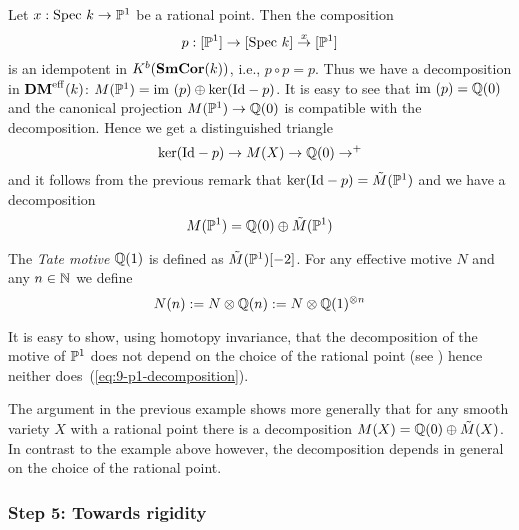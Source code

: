 \begin{exam}
  Let $x: \mathrm{Spec}~ k \to \mathbb{P}^1$ be a rational point. Then the
  composition
\begin{equation*}
  p: [\mathbb{P}^1] \to [\mathrm{Spec}~ k] \stackrel{x}{\to} [\mathbb{P}^1]
\end{equation*}
is an idempotent in $K^b(\mathbf{SmCor}(k))$, i.e., $p \circ p = p$. Thus we
have a decomposition in $\mathbf{DM}^{\mathrm{eff}}(k)$:
$M(\mathbb{P}^1)=\mathrm{im}~(p)\oplus\ker(\mathrm{Id}-p)$. It is easy to see
that $\mathrm{im}~(p)=\mathbb{Q}(0)$ and the canonical projection
$M(\mathbb{P}^1)\to\mathbb{Q}(0)$ is compatible with the decomposition. Hence we
get a distinguished triangle
\begin{equation*}
  \ker(\mathrm{Id}-p)\to M(X)\to\mathbb{Q}(0)\to^{+}
\end{equation*}
and it follows from the previous remark that
$\ker(\mathrm{Id}-p)=\tilde{M}(\mathbb{P}^{1})$ and we have a decomposition
\begin{equation*}
  M(\mathbb{P}^{1})=\mathbb{Q}(0)\oplus\tilde{M}(\mathbb{P}^{1})
\end{equation*}  
\end{exam}
\begin{defn}
  The \emph{Tate motive} $\mathbb{Q}(1)$ is defined as
  $\tilde{M}(\mathbb{P}^{1})[-2]$. For any effective motive $N$ and any
  $n\in\mathbb{N}$ we define
  \begin{equation*}
    N(n):=N\otimes\mathbb{Q}(n):=N\otimes\mathbb{Q}(1)^{\otimes n}
  \end{equation*}
\end{defn}
It is easy to show, using homotopy invariance, that the decomposition
of the motive of $\mathbb{P}^{1}$ does not depend on the choice of the
rational point (see \cite[16.3.1.3]{andre04-motifs}) hence neither
does~(\ref{eq:9-p1-decomposition}).
\begin{rem}
  The argument in the previous example shows more generally that for
  any smooth variety $X$ with a rational point there is a
  decomposition $M(X)=\mathbb{Q}(0)\oplus \tilde{M}(X)$. In contrast to the
  example above however, the decomposition depends in general on the
  choice of the rational point.
\end{rem}
\subsubsection{Step 5: Towards rigidity}

